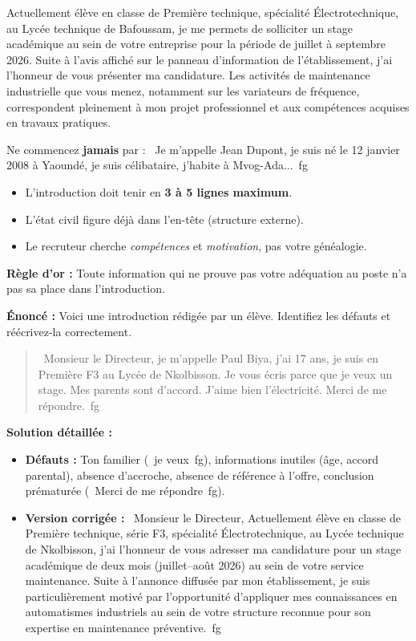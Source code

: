 \documentclass[11pt]{article}
\begin{document}
\begin{exemplebox}
Actuellement élève en classe de Première technique, spécialité Électrotechnique, au Lycée technique de Bafoussam, je me permets de solliciter un stage académique au sein de votre entreprise pour la période de juillet à septembre 2026. Suite à l'avis affiché sur le panneau d'information de l'établissement, j'ai l'honneur de vous présenter ma candidature. Les activités de maintenance industrielle que vous menez, notamment sur les variateurs de fréquence, correspondent pleinement à mon projet professionnel et aux compétences acquises en travaux pratiques.
\end{exemplebox}

\begin{attention}
Ne commencez \textbf{jamais} par : \og~Je m'appelle Jean Dupont, je suis né le 12 janvier 2008 à Yaoundé, je suis célibataire, j'habite à Mvog-Ada...~\/fg
\begin{itemize}
    \item L'introduction doit tenir en \textbf{3 à 5 lignes maximum}.
    \item L'état civil figure déjà dans l'en-tête (structure externe).
    \item Le recruteur cherche \emph{compétences} et \emph{motivation}, pas votre généalogie.
\end{itemize}
\textbf{Règle d'or :} Toute information qui ne prouve pas votre adéquation au poste n'a pas sa place dans l'introduction.
\end{attention}

\begin{exoresolu}
\textbf{Énoncé :} Voici une introduction rédigée par un élève. Identifiez les défauts et réécrivez-la correctement.
\begin{quote}
\og~Monsieur le Directeur, je m'appelle Paul Biya, j'ai 17 ans, je suis en Première F3 au Lycée de Nkolbisson. Je vous écris parce que je veux un stage. Mes parents sont d'accord. J'aime bien l'électricité. Merci de me répondre.~\/fg
\end{quote}
\tcblower
\textbf{Solution détaillée :}
\begin{itemize}
    \item \textbf{Défauts :} Ton familier (\og~je veux~\/fg), informations inutiles (âge, accord parental), absence d'accroche, absence de référence à l'offre, conclusion prématurée (\og~Merci de me répondre~\/fg).
    \item \textbf{Version corrigée :}
    \og~Monsieur le Directeur,
    Actuellement élève en classe de Première technique, série F3, spécialité Électrotechnique, au Lycée technique de Nkolbisson, j'ai l'honneur de vous adresser ma candidature pour un stage académique de deux mois (juillet--août 2026) au sein de votre service maintenance. Suite à l'annonce diffusée par mon établissement, je suis particulièrement motivé par l'opportunité d'appliquer mes connaissances en automatismes industriels au sein de votre structure reconnue pour son expertise en maintenance préventive.~\/fg
\end{itemize}
\end{exoresolu}
\end{document}
